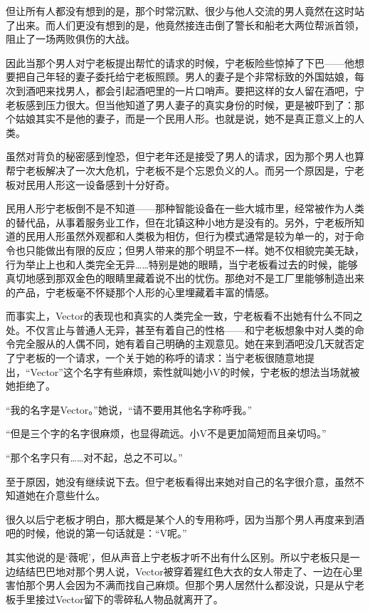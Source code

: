 但让所有人都没有想到的是，那个时常沉默、很少与他人交流的男人竟然在这时站了出来。而人们更没有想到的是，他竟然接连击倒了警长和船老大两位帮派首领，阻止了一场两败俱伤的大战。

因此当那个男人对宁老板提出帮忙的请求的时候，宁老板险些惊掉了下巴——他想要把自己年轻的妻子委托给宁老板照顾。男人的妻子是个非常标致的外国姑娘，每次到酒吧来找男人，都会引起酒吧里的一片口哨声。要把这样的女人留在酒吧，宁老板感到压力很大。但当他知道了男人妻子的真实身份的时候，更是被吓到了：那个姑娘其实不是他的妻子，而是一个民用人形。也就是说，她不是真正意义上的人类。

虽然对背负的秘密感到惶恐，但宁老年还是接受了男人的请求，因为那个男人也算帮宁老板解决了一次大危机，宁老板不是个忘恩负义的人。而另一个原因是，宁老板对民用人形这一设备感到十分好奇。

民用人形宁老板倒不是不知道——那种智能设备在一些大城市里，经常被作为人类的替代品，从事着服务业工作，但在北镇这种小地方是没有的。另外，宁老板所知道的民用人形虽然外观都和人类极为相仿，但行为模式通常是较为单一的，对于命令也只能做出有限的反应；但男人带来的那个明显不一样。她不仅相貌完美无缺，行为举止上也和人类完全无异……特别是她的眼睛，当宁老板看过去的时候，能够真切地感到那双金色的眼睛里藏着说不出的忧伤。那绝对不是工厂里能够制造出来的产品，宁老板毫不怀疑那个人形的心里埋藏着丰富的情感。

而事实上，Vector的表现也和真实的人类完全一致，宁老板看不出她有什么不同之处。不仅言止与普通人无异，甚至有着自己的性格——和宁老板想象中对人类的命令完全服从的人偶不同，她有着自己明确的主观意见。她在来到酒吧没几天就否定了宁老板的一个请求，一个关于她的称呼的请求：当宁老板很随意地提出，“Vector”这个名字有些麻烦，索性就叫她小V的时候，宁老板的想法当场就被她拒绝了。

“我的名字是Vector。”她说，“请不要用其他名字称呼我。”

“但是三个字的名字很麻烦，也显得疏远。小V不是更加简短而且亲切吗。”

“那个名字只有……对不起，总之不可以。”

至于原因，她没有继续说下去。但宁老板看得出来她对自己的名字很介意，虽然不知道她在介意些什么。

很久以后宁老板才明白，那大概是某个人的专用称呼，因为当那个男人再度来到酒吧的时候，他说的第一句话就是：“V呢。”

其实他说的是‘薇呢’，但从声音上宁老板才听不出有什么区别。所以宁老板只是一边结结巴巴地对那个男人说，Vector被穿着猩红色大衣的女人带走了、一边在心里害怕那个男人会因为不满而找自己麻烦。但那个男人居然什么都没说，只是从宁老板手里接过Vector留下的零碎私人物品就离开了。

